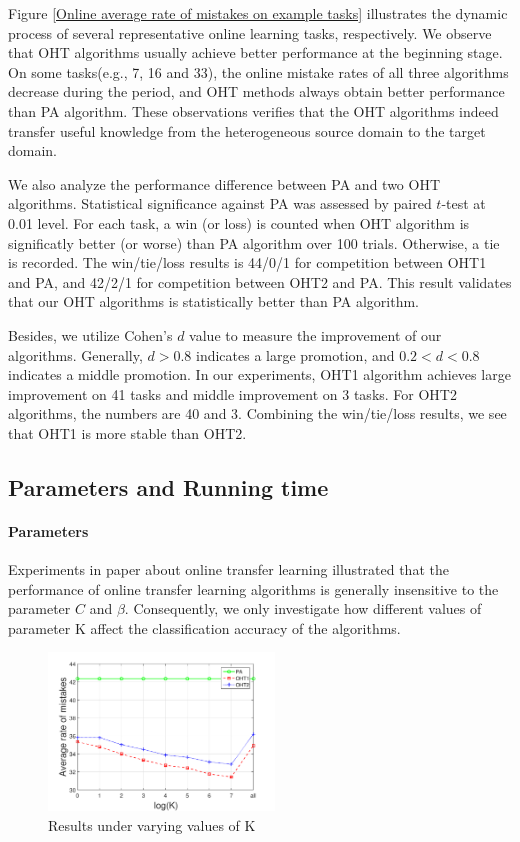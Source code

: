 \documentclass[letterpaper]{article}
\begin{document}
Figure \ref{Online average rate of mistakes on example tasks} illustrates the dynamic process of several representative online learning tasks, respectively.
We observe that OHT algorithms usually achieve better performance at the beginning stage.
On some tasks(e.g., 7, 16 and 33), the online mistake rates of all three algorithms decrease during the period, and OHT methods always obtain better performance than PA algorithm.
These observations verifies that the OHT algorithms indeed transfer useful knowledge from the heterogeneous source domain to the target domain. 

We also analyze the performance difference between PA and two OHT algorithms.
Statistical significance against PA was assessed by paired $t$-test at 0.01 level.
For each task, a win (or loss) is counted when OHT algorithm is significatly better (or worse) than PA algorithm over 100 trials.
Otherwise, a tie is recorded.
The win/tie/loss results is 44/0/1 for competition between OHT1 and PA, and 42/2/1 for competition between  OHT2 and PA.
This result validates that our OHT algorithms is statistically better than PA algorithm.

Besides, we utilize Cohen's $d$ value to measure the improvement of our algorithms.
Generally, $d>0.8$ indicates a large promotion, and $0.2<d<0.8$ indicates a middle promotion.
In our experiments, OHT1 algorithm achieves large improvement on 41 tasks and middle improvement on 3 tasks.
For OHT2 algorithms, the numbers are 40 and 3.
Combining the win/tie/loss results, we see that OHT1 is more stable than OHT2.


\subsection{Parameters and Running time}
\paragraph{Parameters}
Experiments in paper about online transfer learning illustrated that the performance of online transfer learning algorithms is generally insensitive to the parameter $C$ and $\beta$.
Consequently, we only investigate how different values of parameter K affect the classification accuracy of the algorithms.

\begin{figure}[!htb]
\centering
  \includegraphics[width=6cm]{averageeok1.pdf}
  \caption{Results under varying values of K}
  \label{average eok}
\end{figure}
\end{document}
